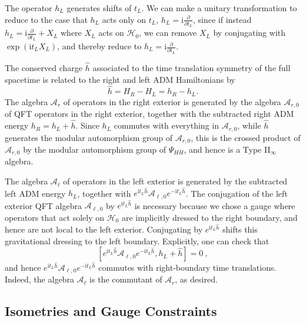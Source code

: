 \documentclass[11pt,a4paper]{article}
\def\be{\begin{equation}}
\def\ee{\end{equation}}
\def\h{\widehat}
\def\A{{\mathcal A}}
\def\h{\widehat}
\def\H{{\mathcal H}}
\def\i{{\mathrm i}}
\begin{document}
The operator $h_L$ generates shifts of $t_L$.    We can make a  unitary transformation to reduce to the case that
$h_L$ acts only on $t_L$, $h_L=\i \frac{\partial}{\partial t_L}$, since if instead $h_L=\i\frac{\partial}{\partial t_L}+X_L$ where $X_L$ acts
on $\H_0$, we can remove $X_L$  by conjugating with $\exp(\i t_L X_L)$, and thereby reduce to $h_L=\i \frac{\partial}{\partial t_L}$.

The  conserved charge $\h h$ associated to the time translation symmetry of the full spacetime is related to the right and left ADM Hamiltonians by
\be \label{ADMconstraint}
\h h=H_R-H_L= h_R-h_L.
\ee
The algebra $\A_r$ of operators in the right exterior is generated by the algebra $\A_{r,0}$ of QFT operators in the right exterior, together with the subtracted right ADM energy $h_R = h_L + \h h$. Since $h_L$ commutes with everything in  $\A_{r,0}$, while $\h h$ generates the modular automorphism group of $\A_{r,0}$,
this is the crossed product of $\A_{r,0}$ by the modular automorphism group of $\Psi_{HH}$, and hence is a Type II$_\infty$ algebra.

The algebra $\A_\ell$ of operators in the left exterior is generated by the subtracted left ADM energy $h_L$, together with $e^{\i t_L \h h}\A_{\ell,0} e^{-\i t_L \h h}$. The conjugation of the left exterior QFT algebra $\A_{\ell,0}$ by $e^{\i t_L \h h}$ is necessary because we chose a gauge where operators that act solely on $\mathcal{H}_0$ are implicitly dressed to the right boundary, and hence are not local to the left exterior. Conjugating by $e^{\i t_L \h h}$ shifts this gravitational dressing to the left boundary. Explicitly, one can check that
\be
\left[ e^{\i t_L \h h}\A_{\ell,0} e^{-\i t_L \h h}, h_L + \h h \right] = 0~,
\ee
and hence $ e^{\i t_L \h h}\A_{\ell,0} e^{-\i t_L \h h}$ commutes with right-boundary time translations. Indeed, the algebra $\A_\ell$ is the commutant of $\A_r$, as desired.

\subsection{Isometries and Gauge Constraints} \label{sec:desitteranalog}
\end{document}
